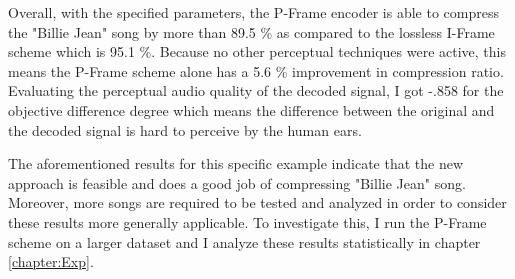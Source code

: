 Overall, with the specified parameters, the P-Frame encoder is able to compress the "Billie Jean" song by more than 89.5 \% as compared to the lossless I-Frame scheme which is 95.1 \%. Because no other perceptual techniques were active, this means the P-Frame scheme alone has a 5.6 \% improvement in compression ratio. Evaluating the perceptual audio quality of the decoded signal, I got -.858 for the objective difference degree which means the difference between the original and the decoded signal is hard to perceive by the human ears.

The aforementioned results for this specific example indicate that the new approach is feasible and does a good job of compressing "Billie Jean"  song. Moreover, more songs are required to be tested and analyzed in order to consider these results more generally applicable. To investigate this, I run the P-Frame scheme on a larger dataset and I analyze these results statistically in chapter \ref{chapter:Exp}.
